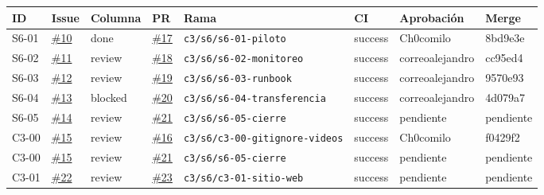 \scriptsize
\begin{tabularx}{\linewidth}{l l l l X l l l}
\toprule
\textbf{ID} & \textbf{Issue} & \textbf{Columna} & \textbf{PR} & \textbf{Rama} & \textbf{CI} & \textbf{Aprobación} & \textbf{Merge} \\
\midrule
S6-01 & \href{https://github.com/OscarSantiagoMerino/DataForge-Consulting/issues/10}{\#10} & done & \href{https://github.com/OscarSantiagoMerino/DataForge-Consulting/pull/17}{\#17} & \texttt{c3/s6/s6-01-piloto} & success & Ch0comilo & 8bd9e3e \\
S6-02 & \href{https://github.com/OscarSantiagoMerino/DataForge-Consulting/issues/11}{\#11} & review & \href{https://github.com/OscarSantiagoMerino/DataForge-Consulting/pull/18}{\#18} & \texttt{c3/s6/s6-02-monitoreo} & success & correoalejandro & cc95ed4 \\
S6-03 & \href{https://github.com/OscarSantiagoMerino/DataForge-Consulting/issues/12}{\#12} & review & \href{https://github.com/OscarSantiagoMerino/DataForge-Consulting/pull/19}{\#19} & \texttt{c3/s6/s6-03-runbook} & success & correoalejandro & 9570e93 \\
S6-04 & \href{https://github.com/OscarSantiagoMerino/DataForge-Consulting/issues/13}{\#13} & blocked & \href{https://github.com/OscarSantiagoMerino/DataForge-Consulting/pull/20}{\#20} & \texttt{c3/s6/s6-04-transferencia} & success & correoalejandro & 4d079a7 \\
S6-05 & \href{https://github.com/OscarSantiagoMerino/DataForge-Consulting/issues/14}{\#14} & review & \href{https://github.com/OscarSantiagoMerino/DataForge-Consulting/pull/21}{\#21} & \texttt{c3/s6/s6-05-cierre} & success & pendiente & pendiente \\
C3-00 & \href{https://github.com/OscarSantiagoMerino/DataForge-Consulting/issues/15}{\#15} & review & \href{https://github.com/OscarSantiagoMerino/DataForge-Consulting/pull/16}{\#16} & \texttt{c3/s6/c3-00-gitignore-videos} & success & Ch0comilo & f0429f2 \\
C3-00 & \href{https://github.com/OscarSantiagoMerino/DataForge-Consulting/issues/15}{\#15} & review & \href{https://github.com/OscarSantiagoMerino/DataForge-Consulting/pull/21}{\#21} & \texttt{c3/s6/s6-05-cierre} & success & pendiente & pendiente \\
C3-01 & \href{https://github.com/OscarSantiagoMerino/DataForge-Consulting/issues/22}{\#22} & review & \href{https://github.com/OscarSantiagoMerino/DataForge-Consulting/pull/23}{\#23} & \texttt{c3/s6/c3-01-sitio-web} & success & pendiente & pendiente \\
\bottomrule
\end{tabularx}
